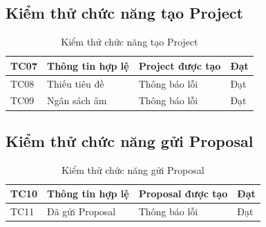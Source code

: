 
\subsection{Kiểm thử chức năng tạo Project}

\begin{table}[H]

\centering

\caption{Kiểm thử chức năng tạo Project}

\begin{tabular}{|p{2cm}|p{4cm}|p{4cm}|p{4cm}|}

\hline

TC07
&
Thông tin hợp lệ
&
Project được tạo
&
Đạt
\\
\hline

TC08
&
Thiếu tiêu đề
&
Thông báo lỗi
&
Đạt
\\
\hline

TC09
&
Ngân sách âm
&
Thông báo lỗi
&
Đạt
\\
\hline

\end{tabular}

\end{table}


\subsection{Kiểm thử chức năng gửi Proposal}

\begin{table}[H]

\centering

\caption{Kiểm thử chức năng gửi Proposal}

\begin{tabular}{|p{2cm}|p{4cm}|p{4cm}|p{4cm}|}

\hline

TC10
&
Thông tin hợp lệ
&
Proposal được tạo
&
Đạt
\\
\hline

TC11
&
Đã gửi Proposal
&
Thông báo lỗi
&
Đạt
\\
\hline

\end{tabular}

\end{table}


